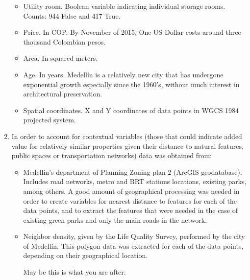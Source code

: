 \documentclass[journal]{IEEEtran}
\begin{document}
\begin{enumerate}
\begin{itemize}
\item Utility room. Boolean variable indicating individual storage rooms. Counts: 944 False and 417 True.

\item Price. In COP. By November of 2015, One US Dollar costs around three thousand Colombian pesos.

\item Area. In squared meters.

\item Age. In years. Medellín is a relatively new city that has undergone exponential growth especially since the 1960’s, without much
interest in architectural preservation. 

\item Spatial coordinates. X and Y coordinates of data points in WGCS 1984 projected system.

\end{itemize}

\item In order to account for contextual variables (those that could indicate added value for relatively similar properties given their distance to natural features, public spaces or transportation networks) data was obtained from:

\begin{itemize}
\item Medellín’s department of Planning Zoning plan 2 (ArcGIS geodatabase). Includes road networks, metro and BRT stations locations, existing parks, among others. A good amount of geographical processing was needed in order to create variables for nearest distance to features for each of the data points, and to extract
the features that were needed in the case of existing green parks and only the main roads in the network.

\item Neighbor density, given by the Life Quality Survey, performed by the city of Medellín. This polygon data was extracted for each of the data points, depending on their geographical location.




	

May be this is what you are after:



\end{itemize}
\end{enumerate}
\end{document}
